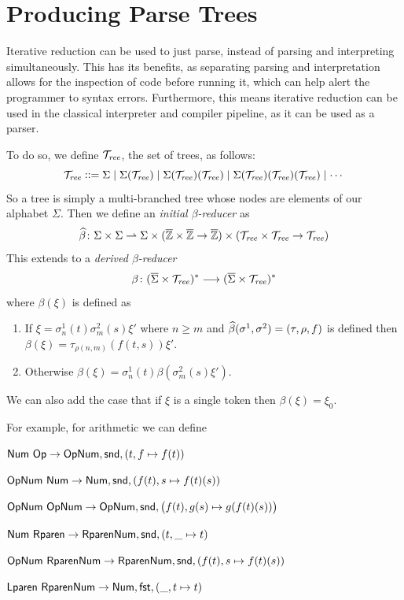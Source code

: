 \documentclass{llncs}
\begin{document}
\section{Producing Parse Trees} \label{producing-parse-trees}

Iterative reduction can be used to just parse, instead of parsing and interpreting simultaneously.
This has its benefits, as separating parsing and interpretation allows for the inspection of code before running it, which can help alert the programmer to syntax errors.
Furthermore, this means iterative reduction can be used in the classical interpreter and compiler pipeline, as it can be used as a parser.

To do so, we define $\mathcal T_{\mathit{ree}}$, the set of trees, as follows:
\[ \mathcal T_{\mathit{ree}} \mathrel{{\mathop:}{\mathop:}{=}} \Sigma \mid \Sigma(\mathcal T_{\mathit{ree}}) \mid \Sigma(\mathcal T_{\mathit{ree}})(\mathcal T_{\mathit{ree}}) \mid \Sigma(\mathcal T_{\mathit{ree}})(\mathcal T_{\mathit{ree}})(\mathcal T_{\mathit{ree}}) \mid \cdots \]
So a tree is simply a multi-branched tree whose nodes are elements of our alphabet $\Sigma$.
Then we define an \textit{initial $\beta$-reducer} as
\[ \widehat\beta\colon \Sigma\times\Sigma \rightharpoonup \Sigma \times (\overline{\mathbb Z}\times\overline{\mathbb Z}\to\overline{\mathbb Z}) \times (\mathcal T_{\mathit{ree}}\times\mathcal T_{\mathit{ree}}\to\mathcal T_{\mathit{ree}}) \]
This extends to a \textit{derived $\beta$-reducer}
\[ \beta\colon (\overline\Sigma\times\mathcal T_{\mathit{ree}})^* \longrightarrow (\overline\Sigma\times\mathcal T_{\mathit{ree}})^* \]
where $\beta(\xi)$ is defined as
\begin{enumerate}
    \item If $\xi=\sigma^1_n(t)\sigma^2_m(s)\xi'$ where $n\geq m$ and $\widehat\beta(\sigma^1,\sigma^2)=(\tau,\rho,f)$ is defined then $\beta(\xi)=\tau_{\rho(n,m)}(f(t,s))\xi'$.
    \item Otherwise $\beta(\xi)=\sigma^1_n(t)\beta(\sigma^2_m(s)\xi')$.
\end{enumerate}
We can also add the case that if $\xi$ is a single token then $\beta(\xi)=\xi_0$.

For example, for arithmetic we can define
\blist
    \item $\mathsf{Num}\ \mathsf{Op}\to\mathsf{Op}\mathsf{Num},\mathsf{snd},(t,f\mapsto f(t))$
    \item $\mathsf{Op}\mathsf{Num}\ \mathsf{Num}\to \mathsf{Num},\mathsf{snd},(f(t),s\mapsto f(t)(s))$
    \item $\mathsf{Op}\mathsf{Num}\ \mathsf{Op}\mathsf{Num}\to \mathsf{Op}\mathsf{Num},\mathsf{snd},\bigl(f(t),g(s)\mapsto g(f(t)(s))\bigr)$
    \item $\mathsf{Num}\ \mathsf{Rparen}\to \mathsf{Rparen}\mathsf{Num},\mathsf{snd},(t,\_\mapsto t)$
    \item $\mathsf{Op}\mathsf{Num}\ \mathsf{Rparen}\mathsf{Num}\to \mathsf{Rparen}\mathsf{Num},\mathsf{snd},(f(t),s\mapsto f(t)(s))$
    \item $\mathsf{Lparen}\ \mathsf{Rparen}\mathsf{Num}\to \mathsf{Num},\mathsf{fst},(\_,t\mapsto t)$
\elist
\end{document}
